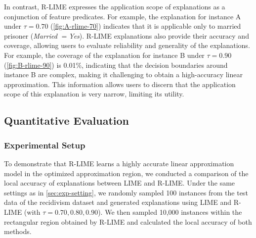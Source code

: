 \documentclass[runningheads]{llncs}
\begin{document}
In contrast, R-LIME expresses the application scope of explanations
as a conjunction of feature predicates.
For example, the explanation for instance A
under $\tau=0.70$ (\cref{fig:A-rlime-70}) indicates that it is applicable
only to married prisoner (\emph{Married} $=$\emph{Yes}).
R-LIME explanations also provide their accuracy and coverage,
allowing users to evaluate reliability and generality of the explanations.
For example, the coverage of the explanation for instance B under $\tau=0.90$
(\cref{fig:B-rlime-90}) is 0.01\%,
indicating that the decision boundaries around instance B are complex,
making it challenging to obtain a high-accuracy linear approximation.
This information allows users to discern that
the application scope of this explanation is very narrow, limiting its utility.

\subsection{Quantitative Evaluation}
\subsubsection{Experimental Setup}
To demonstrate that R-LIME learns a highly accurate linear approximation model
in the optimized approximation region,
we conducted a comparison of the local accuracy of explanations
between LIME and R-LIME\@.
Under the same settings as in \cref{sec:exp-setting},
we randomly sampled 100 instances from the test data of the recidivism dataset
and generated explanations using LIME and R-LIME (with $\tau=0.70,0.80,0.90$).
We then sampled 10,000 instances within the rectangular region
obtained by R-LIME and calculated the local accuracy of both methods.
\end{document}
